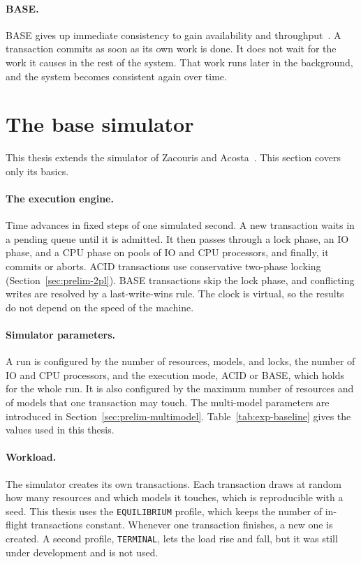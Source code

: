 \paragraph{BASE.}\label{sec:prelim-base}
BASE gives up immediate consistency to gain availability and
throughput~\cite{pritchett2008base,vogels2009eventually}. A transaction commits
as soon as its own work is done. It does not wait for the work it causes in the
rest of the system. That work runs later in the background, and the system
becomes consistent again over time.

\section{The base simulator}\label{sec:prelim-simulator}

This thesis extends the simulator of Zacouris and
Acosta~\cite{zacouris2025m2ts,zacouris2026mxs}. This section covers only its
basics.

\paragraph{The execution engine.}\label{sec:prelim-engine}
Time advances in fixed steps of one simulated second. A new transaction waits in
a pending queue until it is admitted. It then passes through a lock phase, an IO
phase, and a CPU phase on pools of IO and CPU processors, and finally, it commits
or aborts. ACID transactions use conservative two-phase locking
(Section~\ref{sec:prelim-2pl}). BASE transactions skip the lock phase, and
conflicting writes are resolved by a last-write-wins rule. The clock is virtual,
so the results do not depend on the speed of the machine.

\paragraph{Simulator parameters.}\label{sec:prelim-parameters}
A run is configured by the number of resources, models, and locks, the number of
IO and CPU processors, and the execution mode, ACID or BASE, which holds for the
whole run. It is also configured by the maximum number of resources and of
models that one transaction may touch. The multi-model parameters are introduced
in Section~\ref{sec:prelim-multimodel}. Table~\ref{tab:exp-baseline} gives the
values used in this thesis.


\paragraph{Workload.}\label{sec:prelim-workload-profiles}
The simulator creates its own transactions. Each transaction draws at random how
many resources and which models it touches, which is reproducible with a seed. This thesis uses the \texttt{EQUILIBRIUM} profile, which keeps the
number of in-flight transactions constant. Whenever one transaction finishes, a
new one is created. A second profile,
\texttt{TERMINAL}, lets the load rise and fall, but it was still under
development and is not used.

